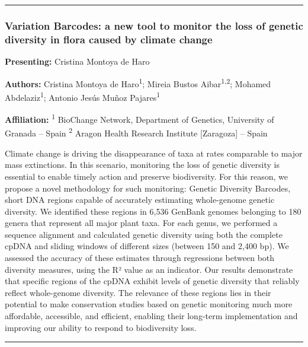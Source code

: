\documentclass[
  letterpaper,
  DIV=11,
  numbers=noendperiod]{scrartcl}
\begin{document}
\begin{center}\rule{0.5\linewidth}{0.5pt}\end{center}

\subsubsection{Variation Barcodes: a new tool to monitor the loss of
genetic diversity in flora caused by climate
change}\label{variation-barcodes-a-new-tool-to-monitor-the-loss-of-genetic-diversity-in-flora-caused-by-climate-change}

\textbf{Presenting:} Cristina Montoya de Haro

\textbf{Authors:} Cristina Montoya de Haro\textsuperscript{1}; Mireia
Bustos Aibar\textsuperscript{1,2}; Mohamed Abdelaziz\textsuperscript{1};
Antonio Jesús Muñoz Pajares\textsuperscript{1}

\textbf{Affiliation:} \textsuperscript{1} BioChange Network, Department
of Genetics, University of Granada -- Spain \textsuperscript{2} Aragon
Health Research Institute {[}Zaragoza{]} -- Spain

Climate change is driving the disappearance of taxa at rates comparable
to major mass extinctions. In this scenario, monitoring the loss of
genetic diversity is essential to enable timely action and preserve
biodiversity. For this reason, we propose a novel methodology for such
monitoring: Genetic Diversity Barcodes, short DNA regions capable of
accurately estimating whole-genome genetic diversity. We identified
these regions in 6,536 GenBank genomes belonging to 180 genera that
represent all major plant taxa. For each genus, we performed a sequence
alignment and calculated genetic diversity using both the complete cpDNA
and sliding windows of different sizes (between 150 and 2,400 bp). We
assessed the accuracy of these estimates through regressions between
both diversity measures, using the R² value as an indicator. Our results
demonstrate that specific regions of the cpDNA exhibit levels of genetic
diversity that reliably reflect whole-genome diversity. The relevance of
these regions lies in their potential to make conservation studies based
on genetic monitoring much more affordable, accessible, and efficient,
enabling their long-term implementation and improving our ability to
respond to biodiversity loss.

\begin{center}\rule{0.5\linewidth}{0.5pt}\end{center}
\end{document}

